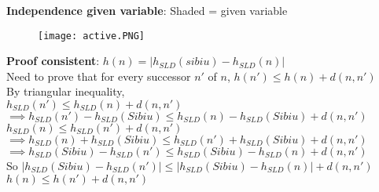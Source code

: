 \documentclass[a4paper,landscape]{article}
\newcommand{\rnname}[1]{\textbf{#1}}
\begin{document}
\begin{multicols*}{4}
\begin{flatitemize}
\item \rnname{Independence given variable}:
Shaded = given variable\\
\vspace{-0.5cm}
    \begin{figure}[H]
      \texttt{[image: active.PNG]}
    \end{figure}
\vspace{-0.4cm}

\item \rnname{Proof consistent}: 
$h(n) = |h_{SLD}(sibiu) - h_{SLD}(n)|$ \\
Need to prove that for every successor $n'$ of $n$, $h(n') \leq h(n) + d(n, n')$ \\
By triangular inequality, \\
$h_{SLD}(n') \leq h_{SLD}(n) + d(n, n')$ \\
$\implies h_{SLD}(n') - h_{SLD}(Sibiu) \leq h_{SLD}(n) - h_{SLD}(Sibiu) + d(n, n')$ \\
$h_{SLD}(n) \leq h_{SLD}(n') + d(n, n')$ \\
$\implies h_{SLD}(n) + h_{SLD}(Sibiu) \leq h_{SLD}(n') + h_{SLD}(Sibiu) + d(n, n')$ \\
$\implies h_{SLD}(Sibiu) - h_{SLD}(n') \leq h_{SLD}(Sibiu) - h_{SLD}(n) + d(n, n')$ \\

So $|h_{SLD}(Sibiu) - h_{SLD}(n')| \leq |h_{SLD}(Sibiu) - h_{SLD}(n)| + d(n, n')$ \\
$h(n) \leq h(n') + d(n, n')$

\end{flatitemize}
\end{multicols*}
\end{document}
